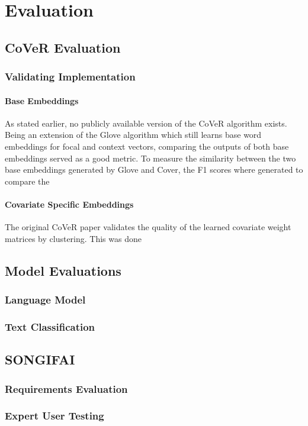 \chapter{Evaluation}
\label{chap:evaluation}
\section{CoVeR Evaluation}
\subsection{Validating Implementation}
\subsubsection{Base Embeddings}
As stated earlier, no publicly available version of the CoVeR algorithm exists. Being an extension of the Glove algorithm which still learns base word embeddings for focal and context vectors, comparing the outputs of both base embeddings served as a good metric. To measure the similarity between the two base embeddings generated by Glove and Cover, the F1 scores where generated to compare the 
\subsubsection{Covariate Specific Embeddings}
The original CoVeR paper validates the quality of the learned covariate weight matrices by clustering. This was done 
\section{Model Evaluations}
\subsection{Language Model}
\subsection{Text Classification}
\section{SONGIFAI}
\subsection{Requirements Evaluation}
\subsection{Expert User Testing}
